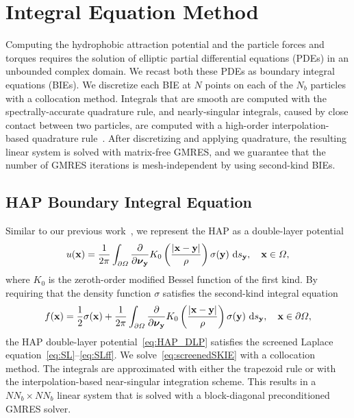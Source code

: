 \documentclass[lineno]{jfm}
\newcommand{\bd}{\partial}
\newcommand{\nnu}{\boldsymbol{\nu}}
\newcommand{\xx}{\mathbf{x}}
\newcommand{\yy}{\mathbf{y}}
\newcommand{\pderiv}[2]{\frac{\partial #1}{\partial #2}}
\begin{document}
\section{Integral Equation Method}
\label{sec:IEM}
Computing the hydrophobic attraction potential and the particle forces
and torques requires the solution of elliptic partial differential
equations (PDEs) in an unbounded complex domain. We recast both these
PDEs as boundary integral equations (BIEs). We discretize each BIE at
$N$ points on each of the $N_b$ particles with a collocation method.
Integrals that are smooth are computed with the spectrally-accurate
quadrature rule, and nearly-singular integrals, caused by close contact
between two particles, are computed with a high-order
interpolation-based quadrature rule~\cite{qua-bir2014}. After
discretizing and applying quadrature, the resulting linear system is
solved with matrix-free GMRES, and we guarantee that the number of GMRES
iterations is mesh-independent by using second-kind BIEs.


\subsection{HAP Boundary Integral Equation}
Similar to our previous work~\cite{Fu20}, we represent the HAP as a
double-layer potential
\begin{align}
  \label{eq:HAP_DLP}
  u(\xx) = \frac{1}{2\pi} \int_{\bd\Omega} \pderiv{}{\nnu_\yy}
    K_0 \left(\frac{|\xx - \yy|}{\rho}\right) \sigma(\yy) \, \dif s_\yy,
    \quad \xx \in \Omega,
\end{align}
where $K_0$ is the zeroth-order modified Bessel function of the first
kind. By requiring that the density function $\sigma$ satisfies the
second-kind integral equation
\begin{equation}
\label{eq:screenedSKIE}
  f(\xx) = \frac{1}{2}\sigma(\xx) + 
    \frac{1}{2\pi}\int_{\bd\Omega} \pderiv{}{\nnu_\yy}
    K_0 \left(\frac{|\xx - \yy|}{\rho}\right) \sigma(\yy) \, \dif s_\yy,
    \quad \xx \in \bd\Omega,
\end{equation}
the HAP double-layer potential~\eqref{eq:HAP_DLP} satisfies the screened
Laplace equation~\eqref{eq:SL}--\eqref{eq:SLff}. We
solve~\eqref{eq:screenedSKIE} with a collocation method. The integrals
are approximated with either the trapezoid rule or with the
interpolation-based near-singular integration scheme. This results in a
$NN_b \times NN_b$ linear system that is solved with a block-diagonal
preconditioned GMRES solver.
\end{document}
